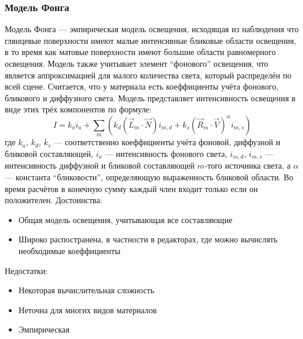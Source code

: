 \documentclass[a4paper,12pt]{report}
\numberwithin{equation}{section}
\begin{document}
\subsubsection*{Модель Фонга}
Модель Фонга \cite{phongmodel} --- эмпирическая модель освещения, исходящая из наблюдения что глянцевые поверхности имеют малые интенсивные бликовые области освещения, в то время как матовые поверхности имеют большие области равномерного освещения. Модель также учитывает элемент ``фонового'' освещения, что является аппроксимацией для малого количества света, который распределён по всей сцене. Считается, что у материала есть коеффициенты учёта фонового, бликового и диффузного света. Модель представляет интенсивность освещения в виде этих трёх компонентов по формуле:
\begin{equation}
I = k_a i_a + \sum_m (k_d (\vec{L}_m \cdot \vec{N}) i_{m,d} + k_s (\vec{R}_m \cdot \vec{V})^{\alpha}i_{m,s})
\end{equation}
где $k_a$, $k_d$, $k_s$ --- соответственно коеффициенты учёта фоновой, диффузной и бликовой составляющей, $i_a$ --- интенсивность фонового света, $i_{m,d}$, $i_{m,s}$ --- интенсивность диффузной и бликовой составляющей $m$-того источника света, а $\alpha$ --- константа ``бликовости'', определяющую выраженность бликовой области. Во время расчётов в конечную сумму каждый член входит только если он положителен.
Достоинства:
\begin{itemize}
\item Общая модель освещения, учитывающая все составляющие
\item Широко распостранена, в частности в редакторах, где можно вычислять необходимые коеффициенты
\end{itemize}
Недостатки:
\begin{itemize}
\item Некоторая вычислительная сложность
\item Неточна для многих видов материалов
\item Эмпирическая
\end{itemize}
\end{document}
